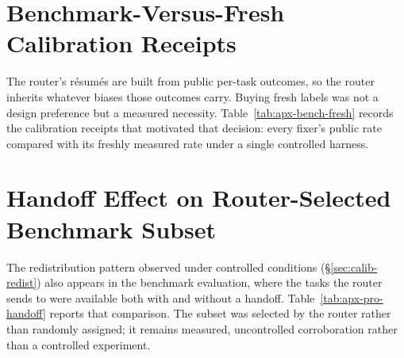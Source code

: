 \section{Benchmark-Versus-Fresh Calibration Receipts}
\label{apx:bench-fresh}

The router's r\'esum\'es are built from public per-task outcomes, so the
router inherits whatever biases those outcomes carry.  Buying fresh labels was
not a design preference but a measured necessity.
Table~\ref{tab:apx-bench-fresh} records the calibration receipts that
motivated that decision: every fixer's public rate compared with its
freshly measured rate under a single controlled harness.

\begin{table}[H]
\centering
\footnotesize
\caption{\textbf{Why we bought fresh labels: public rates do not transfer
to unseen tasks.}  Each fixer's public multilingual rate versus its freshly
measured rate on $100$ post-cutoff Python tasks under one harness.
Every fixer drops; the ordering does not survive.  Rates use the full
$100$-task solo denominator; the paired analysis in
Appendix~\ref{apx:redistribution} uses the $99$ tasks with both arms.
These are calibration receipts, not a benchmark claim.}
\label{tab:apx-bench-fresh}

\end{table}



\section{Handoff Effect on Router-Selected Benchmark Subset}
\label{apx:pro-handoff}

The redistribution pattern observed under controlled conditions
(\S\ref{sec:calib-redist}) also appears in the benchmark evaluation, where
the tasks the router sends to \fxkimi were available both with and without a
handoff.  Table~\ref{tab:apx-pro-handoff} reports that comparison.  The subset
was selected by the router rather than randomly assigned; it remains measured,
uncontrolled corroboration rather than a controlled experiment.

